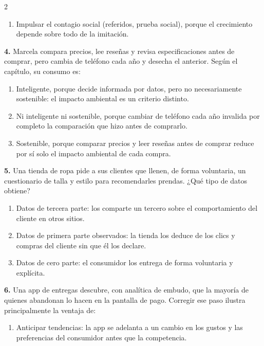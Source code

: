\documentclass[10pt,letterpaper]{article}
\begin{document}
\begin{multicols}{2}
\begin{enumerate}[label=\alph*),leftmargin=1.1em,itemsep=0pt,topsep=1pt,parsep=0pt,partopsep=0pt]
\item Impulsar el contagio social (referidos, prueba social), porque el crecimiento depende sobre todo de la imitación.
\end{enumerate}
\vspace{2pt}
\noindent\textbf{4.} Marcela compara precios, lee reseñas y revisa especificaciones antes de comprar, pero cambia de teléfono cada año y desecha el anterior. Según el capítulo, su consumo es:
\vspace{-3pt}
\begin{enumerate}[label=\alph*),leftmargin=1.1em,itemsep=0pt,topsep=1pt,parsep=0pt,partopsep=0pt]
\item Inteligente, porque decide informada por datos, pero no necesariamente sostenible: el impacto ambiental es un criterio distinto.
\item Ni inteligente ni sostenible, porque cambiar de teléfono cada año invalida por completo la comparación que hizo antes de comprarlo.
\item Sostenible, porque comparar precios y leer reseñas antes de comprar reduce por sí solo el impacto ambiental de cada compra.
\end{enumerate}
\vspace{2pt}
\noindent\textbf{5.} Una tienda de ropa pide a sus clientes que llenen, de forma voluntaria, un cuestionario de talla y estilo para recomendarles prendas. ¿Qué tipo de datos obtiene?
\vspace{-3pt}
\begin{enumerate}[label=\alph*),leftmargin=1.1em,itemsep=0pt,topsep=1pt,parsep=0pt,partopsep=0pt]
\item Datos de tercera parte: los comparte un tercero sobre el comportamiento del cliente en otros sitios.
\item Datos de primera parte observados: la tienda los deduce de los clics y compras del cliente sin que él los declare.
\item Datos de cero parte: el consumidor los entrega de forma voluntaria y explícita.
\end{enumerate}
\vspace{2pt}
\noindent\textbf{6.} Una app de entregas descubre, con analítica de embudo, que la mayoría de quienes abandonan lo hacen en la pantalla de pago. Corregir ese paso ilustra principalmente la ventaja de:
\vspace{-3pt}
\begin{enumerate}[label=\alph*),leftmargin=1.1em,itemsep=0pt,topsep=1pt,parsep=0pt,partopsep=0pt]
\item Anticipar tendencias: la app se adelanta a un cambio en los gustos y las preferencias del consumidor antes que la competencia.

\end{enumerate}
\end{multicols}
\end{document}
